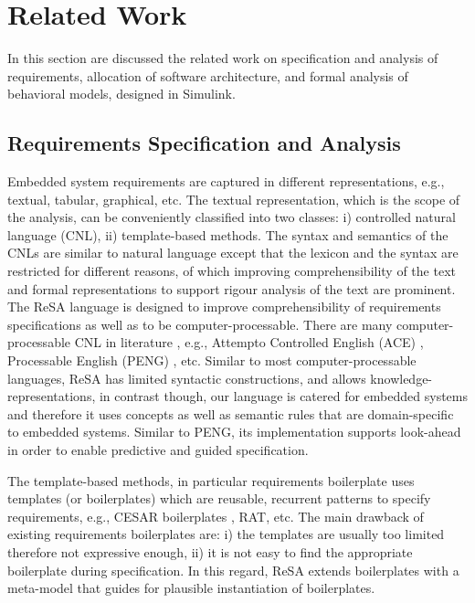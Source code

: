 \chapter{Related Work}
In this section are discussed the related work on specification and analysis of requirements, allocation of software architecture, and formal analysis of behavioral models, designed in Simulink.

\section{Requirements Specification and Analysis}
Embedded system requirements are captured in different representations, e.g., textual, tabular, graphical, etc. The textual representation, which is the scope of the analysis, can be conveniently classified into two classes: i) controlled natural language (CNL), ii) template-based methods.  The syntax and semantics of the CNLs are similar to natural language except that the lexicon and the syntax are restricted for different reasons, of which improving comprehensibility of the text and formal representations to support rigour analysis of the text are prominent. The ReSA language is designed to improve comprehensibility of requirements specifications as well as to be computer-processable. There are many computer-processable CNL in literature \cite{Kuhn2014ALanguages}, e.g., Attempto Controlled English (ACE) \cite{attempto96}, Processable English (PENG) \cite{Schwitter2002EnglishLanguage}, etc. Similar to most computer-processable languages, ReSA has limited syntactic constructions, and allows knowledge-representations, in contrast though, our language is catered for embedded systems and therefore it uses concepts as well as semantic rules that are domain-specific to embedded systems. Similar to PENG, its implementation supports look-ahead in order to enable predictive and guided specification.

The template-based methods, in particular requirements boilerplate uses templates (or boilerplates) which are reusable, recurrent patterns to specify requirements, e.g., CESAR boilerplates \cite{Farfeleder2011DODT:Development}, RAT, etc. The main drawback of existing requirements boilerplates are: i) the templates are usually too limited therefore not expressive enough, ii) it is not easy to find the appropriate boilerplate during specification. In this regard, ReSA extends boilerplates with a meta-model that guides for plausible instantiation of boilerplates.


